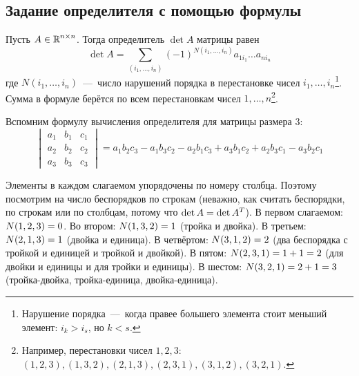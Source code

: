 \documentclass[a4paper,12pt]{article}
\begin{document}
  
  \subsection{Задание определителя с помощью формулы}
  
  \begin{theorem}\label{theor:complete-expansion}
    Пусть $A \in \operatorname{\mathbb R}^{n \times n}$.
    Тогда определитель $\det A$ матрицы равен
    \begin{equation}
      \label{eq:complete-expansion}
      \det A = \sum_{(i_1, \ldots, i_n)} (-1)^{N(i_1, \ldots, i_n)} a_{1 i_1} \ldots a_{n i_n}
    \end{equation}
    где $N(i_1, \ldots, i_n)$~---~число нарушений порядка в перестановке чисел $i_1, \ldots, i_n$\footnote{Нарушение порядка~---~когда правее большего элемента стоит меньший элемент: $i_k > i_s$, но $k < s$.}.
    Сумма в формуле берётся по всем перестановкам чисел $1, \ldots, n$\footnote{Например, перестановки чисел $1, 2, 3$: $(1, 2, 3), (1, 3, 2), (2, 1, 3), (2, 3, 1), (3, 1, 2), (3, 2, 1)$.}.
  \end{theorem}
  
  \begin{example}
    Вспомним формулу вычисления определителя для матрицы размера $3$:
    \begin{equation*}
      \begin{vmatrix}
        a_1 & b_1 & c_1\\
        a_2 & b_2 & c_2\\
        a_3 & b_3 & c_3
      \end{vmatrix}
        = a_1 b_2 c_3 - a_1 b_3 c_2 - a_2 b_1 c_3 + a_3 b_1 c_2 + a_2 b_3 c_1 - a_3 b_2 c_1
    \end{equation*}
    
    Элементы в каждом слагаемом упорядочены по номеру столбца.
    Поэтому посмотрим на число беспорядков по строкам (неважно, как считать беспорядки, по строкам или по столбцам, потому что $\det A \hm= \det A^T$).
    В первом слагаемом: $N(1, 2, 3) \hm= 0$.
    Во втором: $N(1, 3, 2) \hm= 1$ (тройка и двойка).
    В третьем: $N(2, 1, 3) \hm= 1$ (двойка и единица).
    В четвёртом: $N(3, 1, 2) \hm= 2$ (два беспорядка с тройкой и единицей и тройкой и двойкой).
    В пятом: $N(2, 3, 1) \hm= 1 \hm+ 1 \hm= 2$ (для двойки и единицы и для тройки и единицы).
    В шестом: $N(3, 2, 1) \hm= 2 \hm+ 1 \hm= 3$ (тройка-двойка, тройка-единица, двойка-единица).
  \end{example}
  
\end{document}
